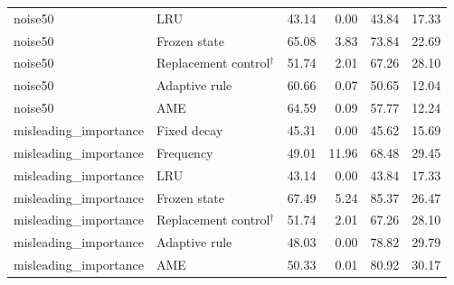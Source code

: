 \begin{longtable}{llrrrr}
noise50 & LRU & 43.14 & 0.00 & 43.84 & 17.33\\
noise50 & Frozen state & 65.08 & 3.83 & 73.84 & 22.69\\
noise50 & Replacement control$^{\dagger}$ & 51.74 & 2.01 & 67.26 & 28.10\\
noise50 & Adaptive rule & 60.66 & 0.07 & 50.65 & 12.04\\
noise50 & AME & 64.59 & 0.09 & 57.77 & 12.24\\
misleading\_importance & Fixed decay & 45.31 & 0.00 & 45.62 & 15.69\\
misleading\_importance & Frequency & 49.01 & 11.96 & 68.48 & 29.45\\
misleading\_importance & LRU & 43.14 & 0.00 & 43.84 & 17.33\\
misleading\_importance & Frozen state & 67.49 & 5.24 & 85.37 & 26.47\\
misleading\_importance & Replacement control$^{\dagger}$ & 51.74 & 2.01 & 67.26 & 28.10\\
misleading\_importance & Adaptive rule & 48.03 & 0.00 & 78.82 & 29.79\\
misleading\_importance & AME & 50.33 & 0.01 & 80.92 & 30.17\\
\bottomrule\end{longtable}